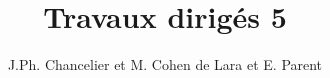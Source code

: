 

\textheight=660pt 
\textwidth=470pt 
\topmargin=-27pt 
\oddsidemargin=0pt 
\evensidemargin=0pt 
\def\cmarg{\hspace{1cm}}
\title{Travaux dirig\'es 5}
\author{J.Ph. Chancelier et M. Cohen de Lara et E. Parent}



\maketitle

\Mhlp
\Mgpeche
\Mequad
\Mubang
\Mpop
\Mpeche
\Mtraj
\Mpechep

